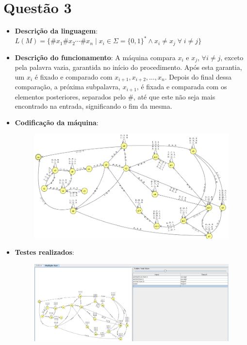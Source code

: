 \documentclass{../sftex/sftex}
\begin{document}
\section*{Questão 3}

\begin{itemize}

    \item \textbf{Descrição da linguagem}:
        $L(M) = \{ \#x_1\#x_2 \cdots \#x_n \mid x_i \in \Sigma = {\{0,1\}}^*
            \land x_i \neq x_j \; \forall \; i \neq j\}$

    \item \textbf{Descrição do funcionamento}: A máquina compara
        $x_i$ e $x_j$, $\forall i\neq j$, exceto pela palavra vazia, garantida
        no início do procedimento. Após esta garantia, um $x_i$ é fixado e
        comparado com $x_{i+1}, x_{i+2}, \ldots, x_n$. Depois do final dessa
        comparação, a próxima subpalavra, $x_{i+1}$, é fixada e comparada com
        os elementos posteriores, separados pelo \#, até que este não seja
        mais encontrado na entrada, significando o fim da mesma.

    \item \textbf{Codificação da máquina}:

        \begin{figure}[htbp]
            \centering
            \includegraphics[scale=0.5]{images/questao3_ss.png}
        \end{figure}

    \item \textbf{Testes realizados}:

        \begin{figure}[htbp]
            \centering
            \includegraphics[width=\textwidth]{images/questao3_inputs.png}
        \end{figure}

\end{itemize}
\end{document}
